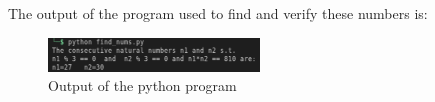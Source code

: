 \documentclass[journal, 12pt, twocolumn]{IEEEtran}
\begin{document}
    The output of the program used to find and verify these numbers is:
    \begin{figure}[h]
        \includegraphics[width=0.5\textwidth]{output.png}
        \caption{Output of the python program}
    \end{figure}
\end{document}
